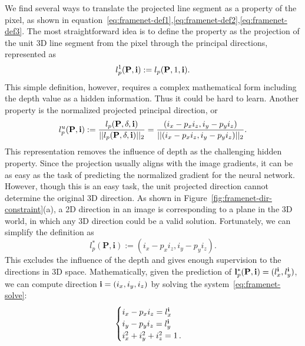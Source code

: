 We find several ways to translate the projected line segment as a property of the pixel, as shown in equation~\ref{eq:framenet-def1},\ref{eq:framenet-def2},\ref{eq:framenet-def3}. The most straightforward idea is to define the property as the projection of the unit 3D line segment from the pixel through the principal directions, represented as 
\begin{equation}
    l^1_p(\textbf{P},\textbf{i}) := l_p(\textbf{P},1,\mathbf{i}).
    \label{eq:framenet-def1}
\end{equation}
This simple definition, however, requires a complex mathematical form including the depth value as a hidden information. Thus it could be hard to learn. Another property is the normalized projected principal direction, or
\begin{equation}
    l^u_p(\textbf{P},\textbf{i}) := \frac{l_p(\textbf{P},\delta,\mathbf{i})}{||l_p(\textbf{P},\delta,\mathbf{i})||_2} = \frac{(i_x - p_x i_z, i_y - p_y i_z)}{||(i_x - p_x i_z, i_y - p_y i_z)||_2}.
    \label{eq:framenet-def2}
\end{equation}
This representation removes the influence of depth as the challenging hidden property. Since the projection usually aligns with the image gradients, it can be as easy as the task of predicting the normalized gradient for the neural network. However, though this is an easy task, the unit projected direction cannot determine the original 3D direction. As shown in Figure~\ref{fig:framenet-dir-constraint}(a), a 2D direction in an image is corresponding to a plane in the 3D world, in which any 3D direction could be a valid solution. Fortunately, we can simplify the definition as
\begin{equation}
    l_p^*(\textbf{P},\textbf{i}) := (i_x - p_xi_z, i_y-p_yi_z).
    \label{eq:framenet-def3}
\end{equation}
This excludes the influence of the depth and gives enough supervision to the directions in 3D space. Mathematically, given the prediction of $\mathbf{l}_p^*(\mathbf{P},\mathbf{i})=(l^{\mathbf{i}}_x,l^{\mathbf{i}}_y)$, we can compute direction $\mathbf{i}=(i_x,i_y,i_z)$ by solving the system~\ref{eq:framenet-solve}:
\begin{equation}
\begin{cases}
  i_x - p_x i_z = l^{\mathbf{i}}_x\\
  i_y - p_y i_z = l^{\mathbf{i}}_y\\
  i_x^2 +i_y^2 + i_z^2 = 1\,.
\end{cases}
\label{eq:framenet-solve}
\end{equation}
